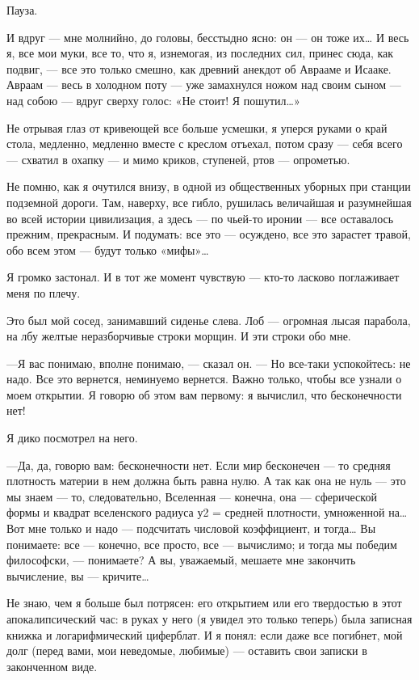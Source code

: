 \documentclass[11pt,openany]{book}
\begin{document}
Пауза.

И вдруг --- мне молнийно, до головы, бесстыдно ясно: он --- он тоже их\ldots{} И весь я, все мои муки, все то, что я, изнемогая, из последних сил, принес сюда, как подвиг, --- все это только смешно, как древний анекдот об Аврааме и Исааке. Авраам --- весь в холодном поту --- уже замахнулся ножом над своим сыном --- над собою --- вдруг сверху голос: «Не стоит! Я пошутил\ldots{}»

Не отрывая глаз от кривеющей все больше усмешки, я уперся руками о край стола, медленно, медленно вместе с креслом отъехал, потом сразу --- себя всего --- схватил в охапку --- и мимо криков, ступеней, ртов --- опрометью.

Не помню, как я очутился внизу, в одной из общественных уборных при станции подземной дороги. Там, наверху, все гибло, рушилась величайшая и разумнейшая во всей истории цивилизация, а здесь --- по чьей-то иронии --- все оставалось прежним, прекрасным. И подумать: все это --- осуждено, все это зарастет травой, обо всем этом --- будут только «мифы»\ldots{}

Я громко застонал. И в тот же момент чувствую --- кто-то ласково поглаживает меня по плечу.

Это был мой сосед, занимавший сиденье слева. Лоб --- огромная лысая парабола, на лбу желтые неразборчивые строки морщин. И эти строки обо мне.

---Я вас понимаю, вполне понимаю, --- сказал он. --- Но все-таки успокойтесь: не надо. Все это вернется, неминуемо вернется. Важно только, чтобы все узнали о моем открытии. Я говорю об этом вам первому: я вычислил, что бесконечности нет!

Я дико посмотрел на него.

---Да, да, говорю вам: бесконечности нет. Если мир бесконечен --- то средняя плотность материи в нем должна быть равна нулю. А так как она не нуль --- это мы знаем --- то, следовательно, Вселенная --- конечна, она --- сферической формы и квадрат вселенского радиуса у2 = средней плотности, умноженной на\ldots{} Вот мне только и надо --- подсчитать числовой коэффициент, и тогда\ldots{} Вы понимаете: все --- конечно, все просто, все --- вычислимо; и тогда мы победим философски, --- понимаете? А вы, уважаемый, мешаете мне закончить вычисление, вы --- кричите\ldots{}

Не знаю, чем я больше был потрясен: его открытием или его твердостью в этот апокалипсический час: в руках у него (я увидел это только теперь) была записная книжка и логарифмический циферблат. И я понял: если даже все погибнет, мой долг (перед вами, мои неведомые, любимые) --- оставить свои записки в законченном виде.
\end{document}
